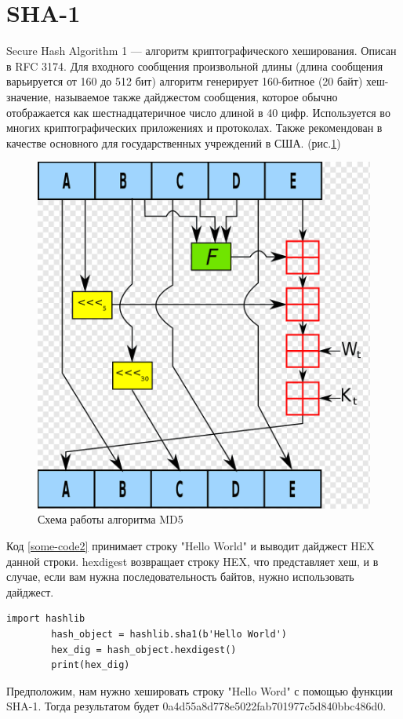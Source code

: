 \documentclass[a4paper, 12pt, oneside]{scrartcl}
\begin{document}
	\section{SHA-1}\label{sec:section3}
	Secure Hash Algorithm 1 — алгоритм криптографического хеширования. Описан в RFC 3174. Для входного сообщения произвольной длины (длина сообщения варьируется от 160 до 512 бит) алгоритм генерирует 160-битное (20 байт) хеш-значение, называемое также дайджестом сообщения, которое обычно отображается как шестнадцатеричное число длиной в 40 цифр. Используется во многих криптографических приложениях и протоколах. Также рекомендован в качестве основного для государственных учреждений в США. (рис.\ref{fig:key2})
	\begin{figure}[h]
		\centering
		\includegraphics[scale=0.3]{sha1}
		\caption{Схема работы алгоритма MD5}
		\label{fig:key2}
	\end{figure}
	\par
	
	Код \ref{some-code2} принимает строку "Hello World" и выводит дайджест HEX данной строки. hexdigest возвращает строку HEX, что представляет хеш, и в случае, если вам нужна последовательность байтов, нужно использовать дайджест.
	\begin{lstlisting}[label=some-code2,caption= SHA-1]
		import hashlib
		hash_object = hashlib.sha1(b'Hello World')
		hex_dig = hash_object.hexdigest()
		print(hex_dig)
	\end{lstlisting}
	Предположим, нам нужно хешировать строку "Hello Word" с помощью функции SHA-1. Тогда результатом будет 0a4d55a8d778e5022fab701977c5d840bbc486d0.
	
	
	
\end{document}
